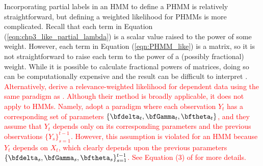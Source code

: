 Incorporating partial labels in an HMM to define a PHMM is relatively straightforward, but defining a weighted likelihood for PHMMs is more complicated. Recall that each term in Equation (\ref{eqn:chp3_like_partial_lambda}) is a scalar value raised to the power of some weight. However, each term in Equation (\ref{eqn:PHMM_like}) is a matrix, so it is not straightforward to raise each term to the power of a (possibly fractional) weight. While it is possible to calculate fractional powers of matrices, doing so can be computationally expensive and the result can be difficult to interpret \citep{Higham:2011}. \textcolor{red}{Alternatively, \citet{Hu:2000} derive a relevance-weighted likelihood for dependent data using the same paradigm as \citet{Hu:2002}. Although their method is broadly applicable, it does not apply to HMMs. Namely, \citet{Hu:2000} adopt a paradigm where each observation $Y_t$ has a corresponding set of parameters $\{\bfdelta_t,\bfGamma_t,\bftheta_t\}$, and they assume that $Y_t$ depends only on its corresponding parameters and the previous observations $\{Y_s\}_{s=1}^{t-1}$. However, this assumption is violated for an HMM because $Y_t$ depends on $X_t$, which clearly depends upon the previous parameters $\{\bfdelta_s,\bfGamma_s,\bftheta_s\}_{s=1}^{t-1}$. See Equation (3) of \citet{Hu:2000} for more details.}

